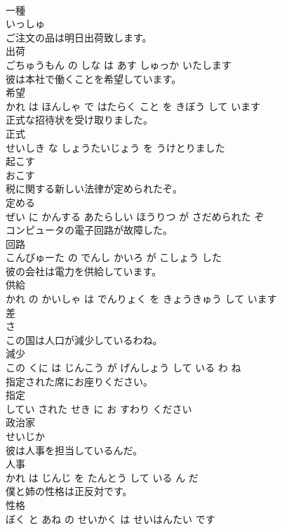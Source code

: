 \documentclass[8pt]{extreport}
\begin{document}
\begin{CJK}{UTF8}{min}
\\	一種	
\\	いっしゅ			
\\	ご注文の品は明日出荷致します。	
\\	出荷 
\\	ごちゅうもん の しな は あす しゅっか いたします			
\\	彼は本社で働くことを希望しています。	
\\	希望 
\\	かれ は ほんしゃ で はたらく こと を きぼう して います			
\\	正式な招待状を受け取りました。	
\\	正式 
\\	せいしき な しょうたいじょう を うけとりました			
\\	起こす	
\\	おこす			
\\	税に関する新しい法律が定められたぞ。	
\\	定める 
\\	ぜい に かんする あたらしい ほうりつ が さだめられた ぞ			
\\	コンピュータの電子回路が故障した。	
\\	回路 
\\	こんぴゅーた の でんし かいろ が こしょう した			
\\	彼の会社は電力を供給しています。	
\\	供給 
\\	かれ の かいしゃ は でんりょく を きょうきゅう して います			
\\	差	
\\	さ			
\\	この国は人口が減少しているわね。	
\\	減少 
\\	この くに は じんこう が げんしょう して いる わ ね			
\\	指定された席にお座りください。	
\\	指定 
\\	してい された せき に お すわり ください			
\\	政治家	
\\	せいじか			
\\	彼は人事を担当しているんだ。	
\\	人事 
\\	かれ は じんじ を たんとう して いる ん だ			
\\	僕と姉の性格は正反対です。	
\\	性格 
\\	ぼく と あね の せいかく は せいはんたい です			

\end{CJK}
\end{document}
